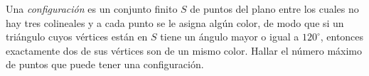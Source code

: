 Una \emph{configuración} es un conjunto finito $S$ de puntos del plano entre los cuales no hay tres colineales y a cada punto se le asigna algún color, de modo que si un triángulo cuyos vértices están en $S$ tiene un ángulo mayor o igual a $120^{\circ}$, entonces exactamente dos de sus vértices son de un mismo color. \newline 
Hallar el número máximo de puntos que puede tener una configuración.

